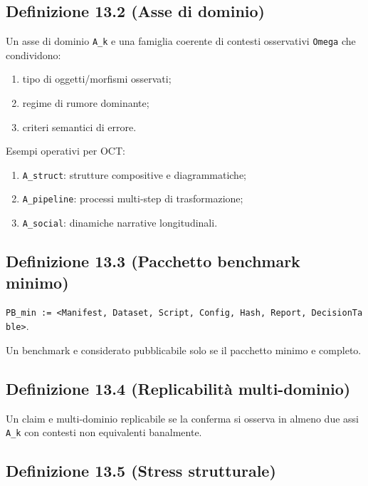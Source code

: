 \subsection{Definizione 13.2 (Asse di dominio)}

Un asse di dominio \texttt{A\_k} e una famiglia coerente di contesti osservativi \texttt{Omega} che condividono:

\begin{enumerate}
\def\labelenumi{\arabic{enumi}.}
\tightlist
\item
  tipo di oggetti/morfismi osservati;
\item
  regime di rumore dominante;
\item
  criteri semantici di errore.
\end{enumerate}

Esempi operativi per OCT:

\begin{enumerate}
\def\labelenumi{\arabic{enumi}.}
\tightlist
\item
  \texttt{A\_struct}: strutture compositive e diagrammatiche;
\item
  \texttt{A\_pipeline}: processi multi-step di trasformazione;
\item
  \texttt{A\_social}: dinamiche narrative longitudinali.
\end{enumerate}

\subsection{Definizione 13.3 (Pacchetto benchmark minimo)}

\texttt{PB\_min\ :=\ \textless{}Manifest,\ Dataset,\ Script,\ Config,\ Hash,\ Report,\ DecisionTable\textgreater{}}.

Un benchmark e considerato pubblicabile solo se il pacchetto minimo e completo.

\subsection{Definizione 13.4 (Replicabilità multi-dominio)}

Un claim e multi-dominio replicabile se la conferma si osserva in almeno due assi \texttt{A\_k} con contesti non equivalenti banalmente.

\subsection{Definizione 13.5 (Stress strutturale)}

